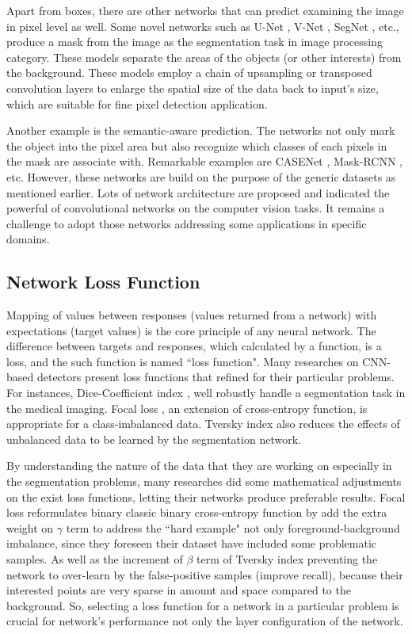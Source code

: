 \documentclass[default,pdflatex,iicol]{sn-jnl}%
\begin{document}
Apart from boxes, there are other networks that can predict examining the image in pixel level as well. Some novel networks such as U-Net \cite{unet}, V-Net \cite{vnet}, SegNet \cite{segnet}, etc., produce a mask from the image as the segmentation task in image processing category. These models separate the areas of the objects (or other interests) from the background. These models employ a chain of upsampling or transposed convolution layers to enlarge the spatial size of the data back to input's size, which are suitable for fine pixel detection application.

Another example is the semantic-aware prediction. The networks not only mark the object into the pixel area but also recognize which classes of each pixels in the mask are associate with. Remarkable examples are CASENet \cite{casenet}, Mask-RCNN \cite{maskrcnn}, etc. However, these networks are build on the purpose of the generic datasets as mentioned earlier. Lots of network architecture are proposed and indicated the powerful of convolutional networks on the computer vision tasks. It remains a challenge to adopt those networks addressing some applications in specific domains.

\subsection{Network Loss Function}\label{review_loss}
Mapping of values between responses (values returned from a network) with expectations (target values) is the core principle of any neural network. The difference  between targets and responses, which calculated by a function, is a loss, and the such function is named ``loss function". Many researches on CNN-based detectors present loss functions that refined for their particular problems. For instances, Dice-Coefficient index \cite{vnet, gendice}, well robustly handle a segmentation task in the medical imaging. Focal loss \cite{focalloss1}, an extension of cross-entropy function, is appropriate for a class-imbalanced data. Tversky index \cite{tverskyloss} also reduces the effects of unbalanced data to be learned by the segmentation network.

By understanding the nature of the data that they are working on especially in the segmentation problems, many researches did some mathematical adjustments on the exist loss functions, letting their networks produce preferable results. Focal loss \cite{focalloss1} reformulates binary classic binary cross-entropy function by add the extra weight on $\gamma$ term to address the ``hard example" not only foreground-background imbalance, since they foreseen their dataset have included some problematic samples. As well as the increment of $\beta$ term of Tversky index \cite{tverskyloss} preventing the network to over-learn by the false-positive samples (improve recall), because their interested points are very sparse in amount and space compared to the background. So, selecting a loss function for a network in a particular problem is crucial for network's performance not only the layer configuration of the network.
\end{document}
